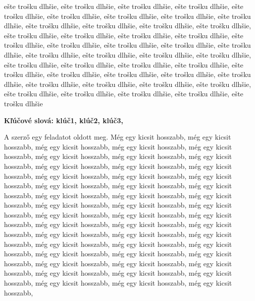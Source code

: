 \documentclass[a4paper,oneside,onecolumn,12pt]{LegrandOrangeBook}
\begin{document}
\label{sec:abstrakt}

ešte trošku dlhšie, ešte trošku dlhšie, ešte trošku dlhšie, ešte trošku dlhšie, ešte trošku dlhšie, ešte trošku dlhšie, ešte trošku dlhšie, ešte trošku dlhšie, ešte trošku dlhšie, ešte trošku dlhšie, ešte trošku dlhšie, ešte trošku dlhšie, ešte trošku dlhšie, ešte trošku dlhšie, ešte trošku dlhšie, ešte trošku dlhšie, ešte trošku dlhšie, ešte trošku dlhšie, ešte trošku dlhšie, ešte trošku dlhšie, ešte trošku dlhšie, ešte trošku dlhšie, ešte trošku dlhšie, ešte trošku dlhšie, ešte trošku dlhšie, ešte trošku dlhšie, ešte trošku dlhšie, ešte trošku dlhšie, ešte trošku dlhšie, ešte trošku dlhšie, ešte trošku dlhšie, ešte trošku dlhšie, ešte trošku dlhšie, ešte trošku dlhšie, ešte trošku dlhšie, ešte trošku dlhšie, ešte trošku dlhšie, ešte trošku dlhšie, ešte trošku dlhšie, ešte trošku dlhšie, ešte trošku dlhšie, ešte trošku dlhšie, ešte trošku dlhšie, ešte trošku dlhšie

\textbf{Kľúčové slová: klúč1, klúč2, klúč3, }
\pagebreak

\label{sec:absztrakt}

A szerző egy feladatot oldott meg. Még egy kicsit hosszabb, még egy kicsit hosszabb, még egy kicsit hosszabb, még egy kicsit hosszabb, még egy kicsit hosszabb, még egy kicsit hosszabb, még egy kicsit hosszabb, még egy kicsit hosszabb, még egy kicsit hosszabb, még egy kicsit hosszabb, még egy kicsit hosszabb, még egy kicsit hosszabb, még egy kicsit hosszabb, még egy kicsit hosszabb, még egy kicsit hosszabb, még egy kicsit hosszabb, még egy kicsit hosszabb, még egy kicsit hosszabb, még egy kicsit hosszabb, még egy kicsit hosszabb, még egy kicsit hosszabb, még egy kicsit hosszabb, még egy kicsit hosszabb, még egy kicsit hosszabb, még egy kicsit hosszabb, még egy kicsit hosszabb, még egy kicsit hosszabb, még egy kicsit hosszabb, még egy kicsit hosszabb, még egy kicsit hosszabb, még egy kicsit hosszabb, még egy kicsit hosszabb, még egy kicsit hosszabb, még egy kicsit hosszabb, még egy kicsit hosszabb, még egy kicsit hosszabb, még egy kicsit hosszabb, még egy kicsit hosszabb, még egy kicsit hosszabb, még egy kicsit hosszabb, még egy kicsit hosszabb, még egy kicsit hosszabb, még egy kicsit hosszabb, még egy kicsit hosszabb, még egy kicsit hosszabb, még egy kicsit hosszabb, még egy kicsit hosszabb, 
\end{document}
